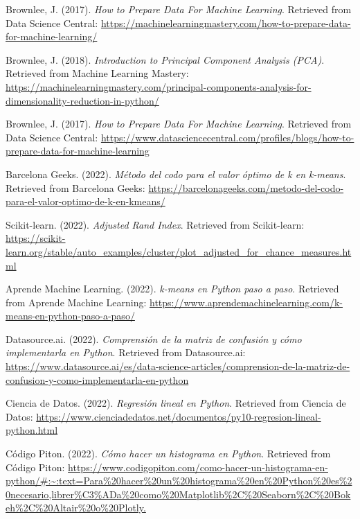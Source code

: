 \documentclass{wsdcr}
\begin{document}
\begin{thebibliography}{9}

    Brownlee, J. (2017).
    \textit{How to Prepare Data For Machine Learning}.
    Retrieved from Data Science Central: \url{https://machinelearningmastery.com/how-to-prepare-data-for-machine-learning/}

    Brownlee, J. (2018).
    \textit{Introduction to Principal Component Analysis (PCA)}.
    Retrieved from Machine Learning Mastery: \url{https://machinelearningmastery.com/principal-components-analysis-for-dimensionality-reduction-in-python/}

    Brownlee, J. (2017).
    \textit{How to Prepare Data For Machine Learning}.
    Retrieved from Data Science Central: \url{https://www.datasciencecentral.com/profiles/blogs/how-to-prepare-data-for-machine-learning}

    Barcelona Geeks. (2022).
    \textit{Método del codo para el valor óptimo de k en k-means}.
    Retrieved from Barcelona Geeks: \url{https://barcelonageeks.com/metodo-del-codo-para-el-valor-optimo-de-k-en-kmeans/}

    Scikit-learn. (2022).
    \textit{Adjusted Rand Index}.
    Retrieved from Scikit-learn: \url{https://scikit-learn.org/stable/auto_examples/cluster/plot_adjusted_for_chance_measures.html}

    Aprende Machine Learning. (2022).
    \textit{k-means en Python paso a paso}.
    Retrieved from Aprende Machine Learning: \url{https://www.aprendemachinelearning.com/k-means-en-python-paso-a-paso/}

    Datasource.ai. (2022).
    \textit{Comprensión de la matriz de confusión y cómo implementarla en Python}.
    Retrieved from Datasource.ai: \url{https://www.datasource.ai/es/data-science-articles/comprension-de-la-matriz-de-confusion-y-como-implementarla-en-python}

    Ciencia de Datos. (2022).
    \textit{Regresión lineal en Python}.
    Retrieved from Ciencia de Datos: \url{https://www.cienciadedatos.net/documentos/py10-regresion-lineal-python.html}

    Código Piton. (2022).
    \textit{Cómo hacer un histograma en Python}.
    Retrieved from Código Piton: \url{https://www.codigopiton.com/como-hacer-un-histograma-en-python/#:~:text=Para%20hacer%20un%20histograma%20en%20Python%20es%20necesario,librer%C3%ADa%20como%20Matplotlib%2C%20Seaborn%2C%20Bokeh%2C%20Altair%20o%20Plotly.}

\end{thebibliography}
\end{document}
